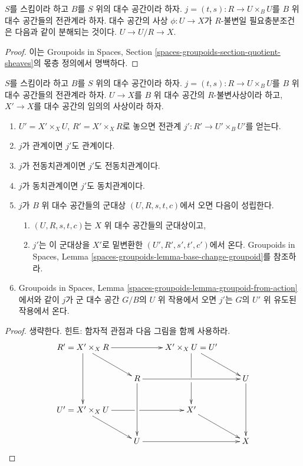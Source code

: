 \begin{lemma}
\label{lemma-invariant}
$S$를 스킴이라 하고 $B$를 $S$ 위의 대수 공간이라 하자.
$j = (t, s) : R \to U \times_B U$를 $B$ 위 대수 공간들의 전관계라 하자.
대수 공간의 사상 $\phi : U \to X$가 $R$-불변일 필요충분조건은
다음과 같이 분해되는 것이다.
$U \to U/R \to X$.
\end{lemma}

\begin{proof}
이는 Groupoids in Spaces, Section
\ref{spaces-groupoids-section-quotient-sheaves}의 몫층 정의에서 명백하다.
\end{proof}

\begin{lemma}
\label{lemma-base-change-on-invariant}
$S$를 스킴이라 하고 $B$를 $S$ 위의 대수 공간이라 하자.
$j = (t, s) : R \to U \times_B U$를 $B$ 위 대수 공간들의 전관계라 하자.
$U \to X$를 $B$ 위 대수 공간의 $R$-불변사상이라 하고,
$X' \to X$를 대수 공간의 임의의 사상이라 하자.
\begin{enumerate}
\item $U' = X' \times_X U$, $R' = X' \times_X R$로 놓으면 전관계
$j' : R' \to U' \times_B U'$를 얻는다.
\item $j$가 관계이면 $j'$도 관계이다.
\item $j$가 전동치관계이면 $j'$도 전동치관계이다.
\item $j$가 동치관계이면 $j'$도 동치관계이다.
\item $j$가 $B$ 위 대수 공간들의 군대상
$(U, R, s, t, c)$에서 오면 다음이 성립한다.
\begin{enumerate}
\item $(U, R, s, t, c)$는 $X$ 위 대수 공간들의 군대상이고,
\item $j'$는 이 군대상을 $X'$로 밑변환한
$(U', R', s', t', c')$에서 온다. Groupoids in Spaces, Lemma
\ref{spaces-groupoids-lemma-base-change-groupoid}를 참조하라.
\end{enumerate}
\item Groupoids in Spaces, Lemma
\ref{spaces-groupoids-lemma-groupoid-from-action}에서와 같이 $j$가
군 대수 공간 $G/B$의 $U$ 위 작용에서 오면 $j'$는 $G$의 $U'$ 위
유도된 작용에서 온다.
\end{enumerate}
\end{lemma}

\begin{proof}
생략한다. 힌트: 함자적 관점과 다음 그림을 함께 사용하라.
$$
\xymatrix{
R' = X' \times_X R \ar[dd] \ar[rr] \ar[rd] & &
X' \times_X U = U' \ar'[d][dd] \ar[rd] \\
& R \ar[dd] \ar[rr] & & U \ar[dd] \\
U' = X' \times_X U \ar'[r][rr] \ar[rd] & & X' \ar[rd] \\
& U \ar[rr] & & X
}
$$
\end{proof}

